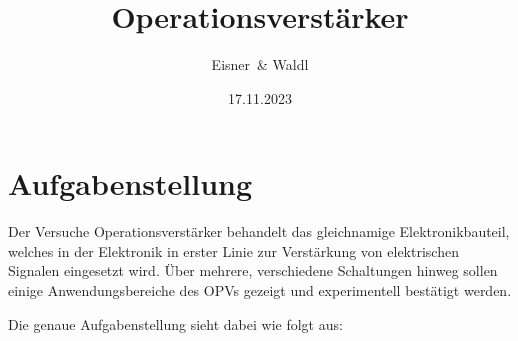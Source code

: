 \documentclass[12pt,a4paper,twoside]{article}
\begin{document}
\newcommand\laboratorynumber{2}
\title{Operationsverstärker}
\newcommand\supervisor{Ditlbacher, Harald}
\newcommand\groupnumber{42}

\newcommand\participantonelastname{Eisner}
\newcommand\participantonefirstname{Nico}
\newcommand\participantoneid{12214121}
\newcommand\participanttwolastname{Waldl}
\newcommand\participanttwofirstname{Philip}
\newcommand\participanttwoid{12214120}
\author{\participantonelastname \ \& \participanttwolastname}

\newcommand\degreeid{UB 033 678}
\newcommand\semester{23WS}
\date{17.11.2023}

\newcommand\coursetitle{Laborübungen 2: \\ Elektrizität, Magnetismus, Optik}

%



\tableofcontents
\newpage

\section{Aufgabenstellung} %

Der Versuche Operationsverstärker behandelt das gleichnamige Elektronikbauteil, welches in der Elektronik in erster Linie zur Verstärkung von elektrischen Signalen eingesetzt wird.
Über mehrere, verschiedene Schaltungen hinweg sollen einige Anwendungsbereiche des OPVs gezeigt und experimentell bestätigt werden.

Die genaue Aufgabenstellung sieht dabei wie folgt aus:
\end{document}
